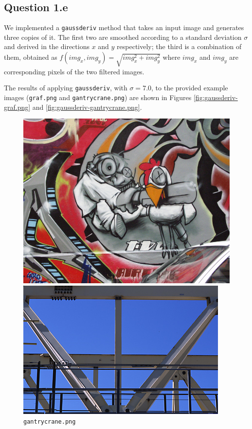 \documentclass{article}
\begin{document}
\subsection{Question 1.e}
We implemented a \verb|gaussderiv| method that takes an input image and generates three copies of it. The first two are smoothed according to a standard deviation $\sigma$ and derived in the directions $x$ and $y$ respectively; the third is a combination of them, obtained as $f(img_x, img_y) = \sqrt{img_x^2 + img_y^2}$ where $img_x$ and $img_y$ are corresponding pixels of the two filtered images.

\noindent
\newline
The results of applying \verb|gaussderiv|, with $\sigma = 7.0$, to the provided example images (\verb|graf.png| and \verb|gantrycrane.png|) are shown in Figures \ref{fig:gaussderiv-graf.png} and \ref{fig:gaussderiv-gantrycrane.png}.

\begin{figure}[ht]
    \centering
    \begin{minipage}{.5\textwidth}
      \centering
      \includegraphics[width=.6\linewidth]{images/Q1.e-graf.png}
      \cprotect\caption{\verb|graf.png|}
      \label{fig:graf.png}
    \end{minipage}%
    \begin{minipage}{.5\textwidth}
      \centering
      \includegraphics[width=.6\linewidth]{images/Q1.e-gantrycrane.png}
      \cprotect\caption{\verb|gantrycrane.png|}
      \label{fig:gantrycrane.png}
    \end{minipage}
\end{figure}
\end{document}

